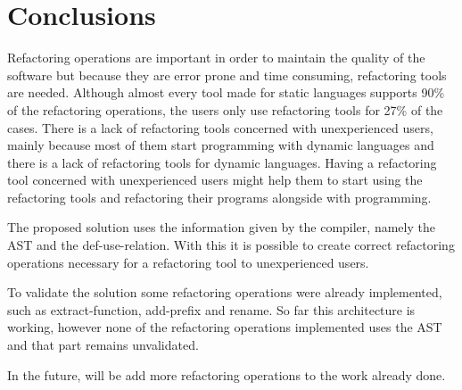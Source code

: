 
% 
% 

\section{Conclusions}


Refactoring operations are important in order to maintain the quality of the software but because they are error prone and time consuming, refactoring tools are needed.
Although almost every tool made for static languages supports 90\% of the refactoring operations, the users only use refactoring tools for 27\% of the cases. 
There is a lack of refactoring tools concerned with unexperienced users, mainly because most of them start programming with dynamic languages and there is a lack of refactoring tools for dynamic languages.
Having a refactoring tool concerned with unexperienced users might help them to start using the refactoring tools and refactoring their programs alongside with programming.

The proposed solution uses the information given by the compiler, namely the AST and the def-use-relation. With this it is possible to create correct refactoring operations necessary for a refactoring tool to unexperienced users.


To validate the solution some refactoring operations were already implemented, such as extract-function, add-prefix and rename. 
So far this architecture is working, however none of the refactoring operations implemented uses the AST and that part remains unvalidated.

In the future, will be add more refactoring operations to the work already done.







